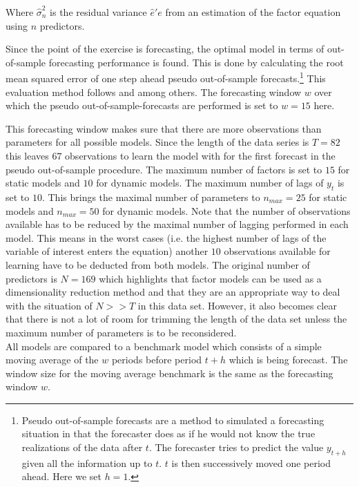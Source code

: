 \documentclass[12pt]{article}
\begin{document}
Where $\hat \sigma_n^2$ is the residual variance $\hat e'e$ from an estimation of the factor equation using $n$ predictors.

Since the point of the exercise is forecasting, the optimal model in terms of out-of-sample forecasting performance is found. This is done by calculating the root mean squared error of one step ahead pseudo out-of-sample forecasts.\footnote{Pseudo out-of-sample forecasts are a method to simulated a forecasting situation in that the forecaster does as if he would not know the true realizations of the data after $t$. The forecaster tries to predict the value $y_{t+h}$ given all the information up to $t$. $t$ is then successively moved one period ahead. Here we set $h=1$.} This evaluation method follows \citet{forni2005the} and \citet{bai2008forecasting} among others. The forecasting window $w$ over which the pseudo out-of-sample-forecasts are performed is set to $w=15$ here. 

This forecasting window makes sure that there are more observations than parameters for all possible models. Since the length of the data series is $T=82$ this leaves $67$ observations to learn the model with for the first forecast in the pseudo out-of-sample procedure. The maximum number of factors is set to $15$ for static models and $10$ for dynamic models. The maximum number of lags of $y_t$ is set to $10$. This brings the maximal number of parameters to $n_{max} = 25$ for static models and $n_{max} = 50$ for dynamic models. Note that the number of observations available has to be reduced by the maximal number of lagging performed in each model. This means in the worst cases (i.e. the highest number of lags of the variable of interest enters the equation) another $10$ observations available for learning have to be deducted from both models. The original number of predictors is $N = 169$ which highlights that factor models can be used as a dimensionality reduction method and that they are an appropriate way to deal with the situation of $N>>T$ in this data set. However, it also becomes clear that there is not a lot of room for trimming the length of the data set unless the maximum number of parameters is to be reconsidered.
\\

All models are compared to a benchmark model which consists of a simple moving average of the $w$ periods before period $t+h$ which is being forecast. The window size for the moving average benchmark is the same as the forecasting window $w$. 
\end{document}
